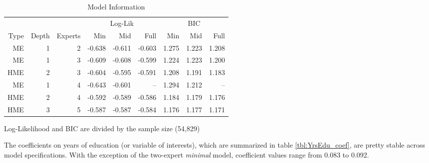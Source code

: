 \documentclass[12pt]{article}
\begin{document}
\begin{table} \centering
  \caption{Model Information}
  \begin{threeparttable}
    \begin{tabular}[l]{r r r r r r r r r}
  \cmidrule{1-9}
       &       &         & \multicolumn{3}{c}{Log-Lik} & \multicolumn{3}{c}{BIC} \\ 
  \cmidrule(r){4-6}   \cmidrule(l){7-9}
  Type & Depth & Experts & Min    & Mid    & Full    & Min   & Mid   & Full       \\
  \cmidrule{1-9}
  ME   & 1     & 2       & -0.638 & -0.611 & -0.603  & 1.275 & 1.223 & 1.208      \\
  ME   & 1     & 3       & -0.609 & -0.608 & -0.599  & 1.224 & 1.223 & 1.200      \\
  HME  & 2     & 3       & -0.604 & -0.595 & -0.591  & 1.208 & 1.191 & 1.183      \\
  ME   & 1     & 4       & -0.643 & -0.601 & --      & 1.294 & 1.212 & --         \\
  HME  & 2     & 4       & -0.592 & -0.589 & -0.586  & 1.184 & 1.179 & 1.176      \\
  HME  & 3     & 5       & -0.587 & -0.587 & -0.584  & 1.176 & 1.177 & 1.171      \\

  \hline
    \end{tabular}
    \begin{tablenotes}
      \item{\footnotesize Log-Likelihood and BIC are divided by the sample size (54,829)}
    \end{tablenotes} \label{tbl:HME_spec_BIC}
  \end{threeparttable}
\end{table}


The coefficients on years of education (or variable of interests), which
are summarized in table \ref{tbl:YrsEdu_coef}, are pretty
stable across model specifications. With the exception of the two-expert
\textit{minimal} model, coefficient values range from 0.083 to 0.092. 
\end{document}
